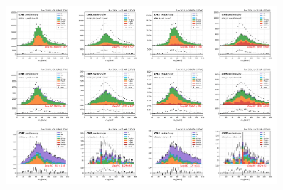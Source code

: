 \begin{figure}
    \centering
    \includegraphics[width=0.9\textwidth]{chapters/Appendix/sectionQCD/figures/ltau1.png}
    
    
    
    

\end{figure}
